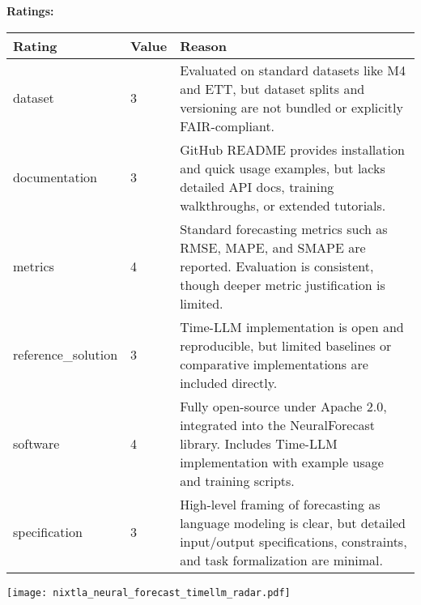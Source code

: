 {{{\bf Ratings:} ~ \\

\begin{tabular}{p{} p{} p{}}
\hline
Rating & Value & Reason \\
\hline
dataset & 3 & Evaluated on standard datasets like M4 and ETT, but dataset splits and versioning are not
bundled or explicitly FAIR-compliant.
 \\
documentation & 3 & GitHub README provides installation and quick usage examples, but lacks detailed API docs,
training walkthroughs, or extended tutorials.
 \\
metrics & 4 & Standard forecasting metrics such as RMSE, MAPE, and SMAPE are reported.
Evaluation is consistent, though deeper metric justification is limited.
 \\
reference\_solution & 3 & Time-LLM implementation is open and reproducible, but limited baselines or comparative
implementations are included directly.
 \\
software & 4 & Fully open-source under Apache 2.0, integrated into the NeuralForecast library.
Includes Time-LLM implementation with example usage and training scripts.
 \\
specification & 3 & High-level framing of forecasting as language modeling is clear, but detailed input/output
specifications, constraints, and task formalization are minimal.
 \\
\hline
\end{tabular}

\texttt{[image: nixtla\_neural\_forecast\_timellm\_radar.pdf]}
}}
\clearpage
